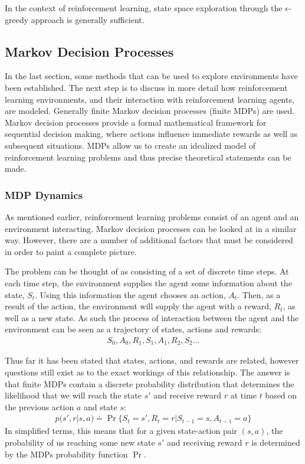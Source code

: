 In the context of reinforcement learning, state space exploration through the $\epsilon$-greedy approach is
generally sufficient.

\subsection{Markov Decision Processes}\label{subsec:mdp}
In the last section, some methods that can be used to explore environments have been established.
The next step is to discuss in more detail how reinforcement learning environments, and their interaction
with reinforcement learning agents, are modeled.
Generally finite Markov decision processes (finite MDPs) are used.
Markov decision processes provide a formal mathematical framework for sequential decision making,
where actions influence immediate rewards as well as subsequent situations\citep{sutton1998reinforcement}.
MDPs allow us to create an idealized model of reinforcement learning problems and thus precise
theoretical statements can be made.

\subsubsection{MDP Dynamics}

As mentioned earlier, reinforcement learning problems consist of an agent and an environment interacting.
Markov decision processes can be looked at in a similar way.
However, there are a number of additional factors that must be considered in order to paint a complete picture.

The problem can be thought of as consisting of a set of discrete time steps.
At each time step, the environment supplies the agent some information about the state, $S_t$.
Using this information the agent chooses an action, $A_t$.
Then, as a result of the action, the environment will supply the agent with a reward, $R_t$, as well as a new state.
As such the process of interaction between the agent and the environment can be seen as a trajectory of states,
actions and rewards\citep{sutton1998reinforcement}:
\begin{align}
    S_0,A_0,R_1,S_1,A_1,R_2,S_2\dots
\end{align}

Thus far it has been stated that states, actions, and rewards are related, however questions still exist as to
the exact workings of this relationship.
The answer is that finite MDPs contain a discrete probability distribution that determines the likelihood that we
will reach the state $s'$ and receive reward $r$ at time $t$ based on the previous action $a$ and state $s$:
\begin{align}
    p(s',r|s,a) \doteq \Pr\{S_t=s',R_t=r|S_{t-1}=s,A_{t-1}=a\}
\end{align}
In simplified terms, this means that for a given state-action pair $(s,a)$, the probability of us reaching some
new state $s'$ and receiving reward $r$ is determined by the MDPs probability function $\Pr$.

